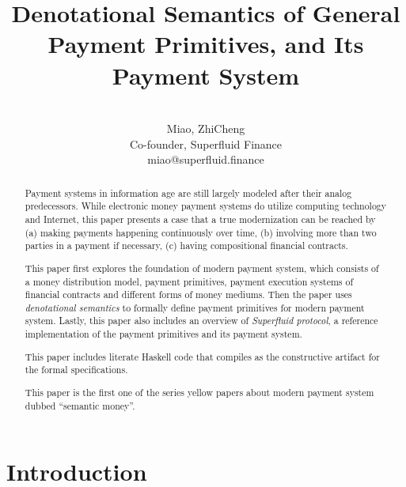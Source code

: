 




\title{Denotational Semantics of General Payment Primitives, and Its Payment System}

\author{\\
    Miao, ZhiCheng\\
    Co-founder, Superfluid Finance\\
    miao@superfluid.finance
}


\maketitle

\begin{abstract}
Payment systems in information age are still largely modeled after their analog predecessors. While
electronic money payment systems do utilize computing technology and Internet, this paper presents a
case that a true modernization can be reached by (a) making payments happening continuously over
time, (b) involving more than two parties in a payment if necessary, (c) having compositional
financial contracts.

This paper first explores the foundation of modern payment system, which consists of a money
distribution model, payment primitives, payment execution systems of financial contracts and
different forms of money mediums. Then the paper uses \textit{denotational semantics} to formally
define payment primitives for modern payment system. Lastly, this paper also includes an overview
of \textit{Superfluid protocol}, a reference implementation of the payment primitives and its
payment system.

This paper includes literate Haskell code that compiles as the constructive artifact for the formal
specifications.

This paper is the first one of the series yellow papers about modern payment system dubbed
``semantic money''.

\end{abstract}

\part*{Introduction}

